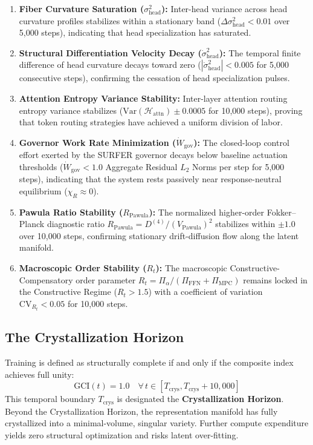 \documentclass[11pt,twocolumn]{article}
\begin{document}
\begin{enumerate}
    \item \textbf{Fiber Curvature Saturation ($\sigma^2_{\text{head}}$):} Inter-head variance across head curvature profiles stabilizes within a stationary band ($\Delta \sigma^2_{\text{head}} < 0.01$ over 5,000 steps), indicating that head specialization has saturated.
    \item \textbf{Structural Differentiation Velocity Decay ($\dot{\sigma}^2_{\text{head}}$):} The temporal finite difference of head curvature decays toward zero ($|\dot{\sigma}^2_{\text{head}}| < 0.005$ for 5,000 consecutive steps), confirming the cessation of head specialization pulses.
    \item \textbf{Attention Entropy Variance Stability:} Inter-layer attention routing entropy variance stabilizes ($\text{Var}(\mathcal{H}_{\text{attn}}) \pm 0.0005$ for 10,000 steps), proving that token routing strategies have achieved a uniform division of labor.
    \item \textbf{Governor Work Rate Minimization ($\dot{W}_{\text{gov}}$):} The closed-loop control effort exerted by the SURFER governor \cite{massif} decays below baseline actuation thresholds ($\dot{W}_{\text{gov}} < 1.0$ Aggregate Residual $L_2$ Norms per step for 5,000 steps), indicating that the system rests passively near response-neutral equilibrium ($\chi_R \approx 0$).
    \item \textbf{Pawula Ratio Stability ($R_{\text{Pawula}}$):} The normalized higher-order Fokker--Planck diagnostic ratio $R_{\text{Pawula}} = D^{(4)} / (V_{\text{Pawula}})^2$ stabilizes within $\pm 1.0$ over 10,000 steps, confirming stationary drift-diffusion flow along the latent manifold.
    \item \textbf{Macroscopic Order Stability ($R_t$):} The macroscopic Constructive-Compensatory order parameter $R_t = \Pi_\alpha / (\Pi_{\text{FFN}} + \Pi_{\text{MPC}})$ remains locked in the Constructive Regime ($R_t > 1.5$) with a coefficient of variation $\text{CV}_{R_t} < 0.05$ for 10,000 steps.
\end{enumerate}

\subsection{The Crystallization Horizon}
Training is defined as structurally complete if and only if the composite index achieves full unity:
\begin{equation}
\text{GCI}(t) = 1.0 \quad \forall \, t \in [T_{\text{crys}}, T_{\text{crys}} + 10,000]
\end{equation}
This temporal boundary $T_{\text{crys}}$ is designated the \textbf{Crystallization Horizon}. Beyond the Crystallization Horizon, the representation manifold has fully crystallized into a minimal-volume, singular variety. Further compute expenditure yields zero structural optimization and risks latent over-fitting.
\end{document}
